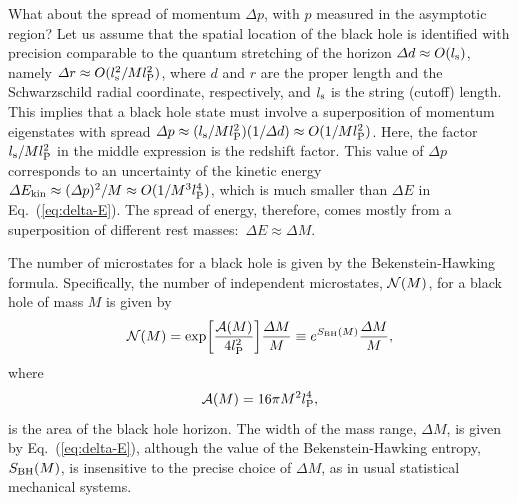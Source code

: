 \documentclass[12pt]{article}
\begin{document}
What about the spread of momentum $\varDelta p$, with $p$ measured 
in the asymptotic region?  Let us assume that the spatial location 
of the black hole is identified with precision comparable to the 
quantum stretching of the horizon $\varDelta d \approx O(l_{\rm s})$, 
namely $\varDelta r \approx O(l_{\rm s}^2/M l_{\rm P}^2)$, where 
$d$ and $r$ are the proper length and the Schwarzschild radial 
coordinate, respectively, and $l_{\rm s}$ is the string (cutoff) 
length.  This implies that a black hole state must involve a 
superposition of momentum eigenstates with spread $\varDelta p 
\approx (l_{\rm s}/M l_{\rm P}^2) (1/\varDelta d) \approx 
O(1/M l_{\rm P}^2)$.  Here, the factor $l_{\rm s}/M l_{\rm P}^2$ 
in the middle expression is the redshift factor.  This value 
of $\varDelta p$ corresponds to an uncertainty of the kinetic 
energy $\varDelta E_{\rm kin} \approx (\varDelta p)^2/M \approx 
O(1/M^3 l_{\rm P}^4)$, which is much smaller than $\varDelta E$ 
in Eq.~(\ref{eq:delta-E}).  The spread of energy, therefore, 
comes mostly from a superposition of different rest masses:\ 
$\varDelta E \approx \varDelta M$.

The number of microstates for a black hole is given by the 
Bekenstein-Hawking formula.  Specifically,  the number of independent 
microstates, ${\cal N}(M)$, for a black hole of mass $M$ is given by
%
\begin{equation}
  {\cal N}(M) = \exp \biggl[\frac{{\cal A}(M)}{4 l_{\rm P}^2}\biggr] 
    \frac{\varDelta M}{M} 
  \equiv e^{S_{\rm BH}(M)} \frac{\varDelta M}{M},
\label{eq:S_BH}
\end{equation}
%
where
%
\begin{equation}
  {\cal A}(M) = 16\pi M^2 l_{\rm P}^4,
\label{eq:A_M}
\end{equation}
%
is the area of the black hole horizon.  The width of the mass 
range, $\varDelta M$, is given by Eq.~(\ref{eq:delta-E}), although 
the value of the Bekenstein-Hawking entropy, $S_{\rm BH}(M)$, is 
insensitive to the precise choice of $\varDelta M$, as in usual 
statistical mechanical systems.
\end{document}
